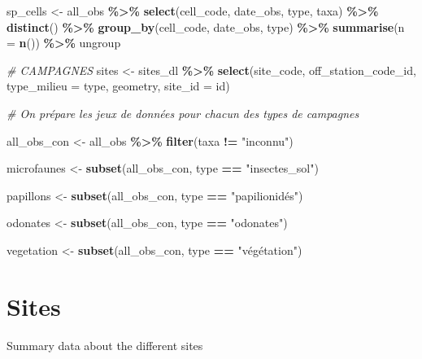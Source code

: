 \documentclass[
]{book}
\newenvironment{Shaded}{\begin{snugshade}}{\end{snugshade}}
\newcommand{\CommentTok}[1]{\textcolor[rgb]{0.56,0.35,0.01}{\textit{#1}}}
\newcommand{\DataTypeTok}[1]{\textcolor[rgb]{0.13,0.29,0.53}{#1}}
\newcommand{\KeywordTok}[1]{\textcolor[rgb]{0.13,0.29,0.53}{\textbf{#1}}}
\newcommand{\NormalTok}[1]{#1}
\newcommand{\OperatorTok}[1]{\textcolor[rgb]{0.81,0.36,0.00}{\textbf{#1}}}
\newcommand{\StringTok}[1]{\textcolor[rgb]{0.31,0.60,0.02}{#1}}
\begin{document}
\begin{Shaded}
\begin{Highlighting}[]
\NormalTok{sp\_cells \textless{}{-}}\StringTok{  }\NormalTok{all\_obs }\OperatorTok{\%\textgreater{}\%}\StringTok{ }
\StringTok{  }\KeywordTok{select}\NormalTok{(cell\_code, date\_obs, type, taxa) }\OperatorTok{\%\textgreater{}\%}\StringTok{ }
\StringTok{  }\KeywordTok{distinct}\NormalTok{() }\OperatorTok{\%\textgreater{}\%}\StringTok{ }
\StringTok{  }\KeywordTok{group\_by}\NormalTok{(cell\_code, date\_obs, type) }\OperatorTok{\%\textgreater{}\%}
\StringTok{  }\KeywordTok{summarise}\NormalTok{(}\DataTypeTok{n =} \KeywordTok{n}\NormalTok{()) }\OperatorTok{\%\textgreater{}\%}\StringTok{ }
\StringTok{  }\NormalTok{ungroup}

\CommentTok{\# CAMPAGNES}
\NormalTok{sites \textless{}{-}}\StringTok{ }\NormalTok{sites\_dl }\OperatorTok{\%\textgreater{}\%}\StringTok{ }
\StringTok{  }\KeywordTok{select}\NormalTok{(site\_code, off\_station\_code\_id,}
         \DataTypeTok{type\_milieu =}\NormalTok{ type, geometry, }\DataTypeTok{site\_id =}\NormalTok{ id)}

\CommentTok{\# On prépare les jeux de données pour chacun des types de campagnes}

\NormalTok{all\_obs\_con \textless{}{-}}\StringTok{  }\NormalTok{all\_obs }\OperatorTok{\%\textgreater{}\%}
\StringTok{  }\KeywordTok{filter}\NormalTok{(taxa }\OperatorTok{!=}\StringTok{ "inconnu"}\NormalTok{)}

\NormalTok{microfaunes \textless{}{-}}\StringTok{ }\KeywordTok{subset}\NormalTok{(all\_obs\_con, type }\OperatorTok{==}\StringTok{ "insectes\_sol"}\NormalTok{)}

\NormalTok{papillons \textless{}{-}}\StringTok{ }\KeywordTok{subset}\NormalTok{(all\_obs\_con, type }\OperatorTok{==}\StringTok{ "papilionidés"}\NormalTok{)}

\NormalTok{odonates \textless{}{-}}\StringTok{ }\KeywordTok{subset}\NormalTok{(all\_obs\_con, type }\OperatorTok{==}\StringTok{ "odonates"}\NormalTok{)}

\NormalTok{vegetation \textless{}{-}}\StringTok{ }\KeywordTok{subset}\NormalTok{(all\_obs\_con, type }\OperatorTok{==}\StringTok{ "végétation"}\NormalTok{)}
\end{Highlighting}
\end{Shaded}

\hypertarget{sites}{%
\chapter{Sites}\label{sites}}

Summary data about the different sites
\end{document}
